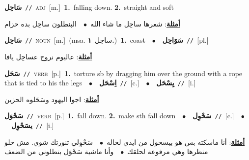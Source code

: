 \documentclass[10pt,a4paper,twoside]{article} %
\begin{document}
\begin{multicols}{2}
{\setlength\topsep{0pt}\textbf{\foreignlanguage{arabic}{سَاحِل}}\ {\color{gray}\texttt{//}\color{black}}\ \textsc{adj}\ [m.]\ \textbf{1.}~falling down.  \textbf{2.}~straight and soft\  \begin{flushright}\color{gray}\foreignlanguage{arabic}{\textbf{\underline{\foreignlanguage{arabic}{أمثلة}}}: شعرها ساحِل ما شاء الله\ $\bullet$\ \  البنطلون ساحِل بده حزام}\end{flushright}\color{black}} \vspace{2mm}

{\setlength\topsep{0pt}\textbf{\foreignlanguage{arabic}{سَاحِل}}\ {\color{gray}\texttt{//}\color{black}}\ \textsc{noun}\ [m.]\ \color{gray}(msa. \foreignlanguage{arabic}{ساحِل}~\foreignlanguage{arabic}{\textbf{١.}})\color{black}\ \textbf{1.}~coast\ \ $\bullet$\ \ \setlength\topsep{0pt}\textbf{\foreignlanguage{arabic}{سَوَاحِل}}\ {\color{gray}\texttt{//}\color{black}}\ [pl.]\  \begin{flushright}\color{gray}\foreignlanguage{arabic}{\textbf{\underline{\foreignlanguage{arabic}{أمثلة}}}: عاليوم نروح عساحِل يافا}\end{flushright}\color{black}} \vspace{2mm}

{\setlength\topsep{0pt}\textbf{\foreignlanguage{arabic}{سَحَل}}\ {\color{gray}\texttt{//}\color{black}}\ \textsc{verb}\ [p.]\ \textbf{1.}~torture sb by dragging him over the ground with a rope that is tied to his the legs\ \ $\bullet$\ \ \setlength\topsep{0pt}\textbf{\foreignlanguage{arabic}{اِسْحَل}}\ {\color{gray}\texttt{//}\color{black}}\ [c.]\ \ $\bullet$\ \ \setlength\topsep{0pt}\textbf{\foreignlanguage{arabic}{يِسْحَل}}\ {\color{gray}\texttt{//}\color{black}}\ [i.]\  \begin{flushright}\color{gray}\foreignlanguage{arabic}{\textbf{\underline{\foreignlanguage{arabic}{أمثلة}}}: اجوا اليهود وسَحَلوه الحزين}\end{flushright}\color{black}} \vspace{2mm}

{\setlength\topsep{0pt}\textbf{\foreignlanguage{arabic}{سَحْوَل}}\ {\color{gray}\texttt{//}\color{black}}\ \textsc{verb}\ [p.]\ \textbf{1.}~fall down.  \textbf{2.}~make sth fall down\ \ $\bullet$\ \ \setlength\topsep{0pt}\textbf{\foreignlanguage{arabic}{سَحْوِل}}\ {\color{gray}\texttt{//}\color{black}}\ [c.]\ \ $\bullet$\ \ \setlength\topsep{0pt}\textbf{\foreignlanguage{arabic}{يسَحْوِل}}\ {\color{gray}\texttt{//}\color{black}}\ [i.]\  \begin{flushright}\color{gray}\foreignlanguage{arabic}{\textbf{\underline{\foreignlanguage{arabic}{أمثلة}}}: أنا ماسكته بس هو بيسحول من ايدي لحاله\ $\bullet$\ \  سَحْوِلي تنورتك شوي. مش حلو منظرها وهي مرفوعة لحلقك\ $\bullet$\ \  وأنا ماشية سَحْوَل بنطلوني من الضعف}\end{flushright}\color{black}} \vspace{2mm}


\end{multicols}
\end{document}
